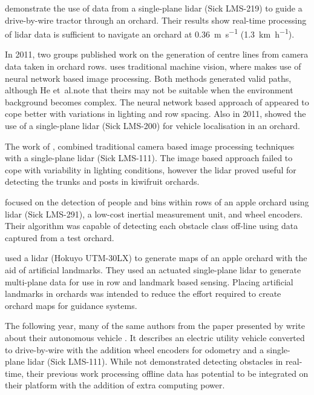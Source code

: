 \documentclass[preprint,authoryear,12pt]{elsarticle}
\begin{document}
        \cite{Barawid2007} demonstrate the use of data from a single-plane lidar (Sick LMS-219) to guide a drive-by-wire tractor through an orchard.
        Their results show real-time processing of lidar data is sufficient to navigate an orchard at \SI{0.36}{\meter\per\second} (\SI{1.3}{\kilo\meter\per\hour}).

        In 2011, two groups published work on the generation of centre lines from camera data taken in orchard rows.
        \cite{He2011} uses traditional machine vision, where \cite{Torres2011} makes use of neural network based image processing.
        Both methods generated valid paths, although He et~al.\@ note that theirs may not be suitable when the environment background becomes complex.
        The neural network based approach of \cite{Torres2011} appeared to cope better with variations in lighting and row spacing.
        Also in 2011, \cite{Hansen2011} showed the use of a single-plane lidar (Sick LMS-200) for vehicle localisation in an orchard.

        The work of \cite{Scarfe2012}, combined traditional camera based image processing techniques with a single-plane lidar (Sick LMS-111).
        The image based approach failed to cope with variability in lighting conditions, however the lidar proved useful for detecting the trunks and posts in kiwifruit orchards.

        \cite{Freitas2012} focused on the detection of people and bins within rows of an apple orchard using lidar (Sick LMS-291), a low-cost inertial measurement unit, and wheel encoders.
        Their algorithm was capable of detecting each obstacle class off-line using data captured from a test orchard.

        \cite{Zhang2014} used a lidar (Hokuyo UTM-30LX) to generate maps of an apple orchard with the aid of artificial landmarks.
        They used an actuated single-plane lidar to generate multi-plane data for use in row and landmark based sensing.
        Placing artificial landmarks in orchards was intended to reduce the effort required to create orchard maps for guidance systems.

        The following year, many of the same authors from  the paper presented by \cite{Zhang2014} write about their autonomous vehicle \citep{Bergerman2015}.
        It describes an electric utility vehicle converted to drive-by-wire with the addition wheel encoders for odometry and a single-plane lidar (Sick LMS-111).
        While not demonstrated detecting obstacles in real-time, their previous work processing offline data \citep{Freitas2012} has potential to be integrated on their platform with the addition of extra computing power.
\end{document}
